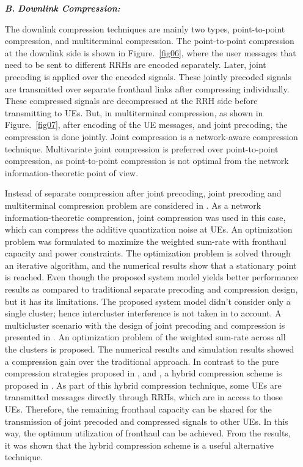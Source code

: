 \begin{multicols}{2}
\begin{itemize}

\item[{\textit{\textbf{ B.}}}] {\textit{\textbf{Downlink Compression:}}}

The downlink compression techniques are mainly two types, point-to-point compression, and multiterminal compression. The point-to-point compression at the downlink side is shown in Figure.~\ref{fig06}, where the user messages that need to be sent to different RRHs are encoded separately. Later, joint precoding is applied over the encoded signals. These jointly precoded signals are transmitted over separate fronthaul links after compressing individually. These compressed signals are decompressed at the RRH side before transmitting to UEs. But, in multiterminal compression, as shown in Figure.~\ref{fig07}, after encoding of the UE messages, and joint precoding, the compression is done jointly. Joint compression is a network-aware compression technique. Multivariate joint compression is preferred over point-to-point compression, as point-to-point compression is not optimal from the network information-theoretic point of view.

Instead of separate compression after joint precoding, joint precoding and multiterminal compression problem are considered in \cite{art3-key59}. As a network information-theoretic compression, joint compression was used in this case, which can compress the additive quantization noise at UEs. An optimization problem was formulated to maximize the weighted sum-rate with fronthaul capacity and power constraints. The optimization problem is solved through an iterative algorithm, and the numerical results show that a stationary point is reached. Even though the proposed system model yields better performance results as compared to traditional separate precoding and compression design, but it has its limitations. The proposed system model didn’t consider only a single cluster; hence intercluster interference is not taken in to account. A multicluster scenario with the design of joint precoding and compression is presented in \cite{art3-key60}. An optimization problem of the weighted sum-rate across all the clusters is proposed. The numerical results and simulation results showed a compression gain over the traditional approach. In contrast to the pure compression strategies proposed in \cite{art3-key59}, and \cite{art3-key60}, a hybrid compression scheme is proposed in \cite{art3-key61}. As part of this hybrid compression technique, some UEs are transmitted messages directly through RRHs, which are in access to those UEs. Therefore, the remaining fronthaul capacity can be shared for the transmission of joint precoded and compressed signals to other UEs. In this way, the optimum utilization of fronthaul can be achieved. From the results, it was shown that the hybrid compression scheme is a useful alternative technique. 


\end{itemize}
\end{multicols}
